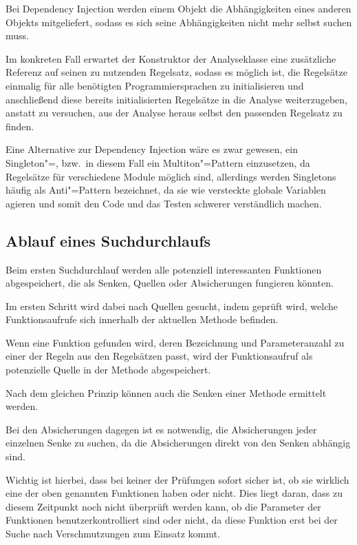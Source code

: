             Bei Dependency Injection werden einem Objekt die Abhängigkeiten eines anderen Objekts mitgeliefert,
            sodass es sich seine Abhängigkeiten nicht mehr selbst suchen muss.

            Im konkreten Fall erwartet der Konstruktor der Analyseklasse eine zusätzliche Referenz auf seinen zu nutzenden Regelsatz,
            sodass es möglich ist,
            die Regelsätze einmalig für alle benötigten Programmiersprachen zu initialisieren und
            anschließend diese bereits initialisierten Regelsätze in die Analyse weiterzugeben,
            anstatt zu versuchen,
            aus der Analyse heraus selbst den passenden Regelsatz zu finden.

            Eine Alternative zur Dependency Injection wäre es zwar gewesen,
            ein Singleton"=,
            bzw.\ in diesem Fall ein Multiton"=Pattern einzusetzen,
            da Regelsätze für verschiedene Module möglich sind,
            allerdings werden Singletons häufig als Anti"=Pattern bezeichnet,\cite{Hevery2008}
            da sie wie versteckte globale Variablen agieren und
            somit den Code und
            das Testen schwerer verständlich machen.

        \subsection{Ablauf eines Suchdurchlaufs}
            Beim ersten Suchdurchlauf werden alle potenziell interessanten Funktionen abgespeichert,
            die als Senken,
            Quellen oder
            Absicherungen fungieren könnten.

            Im ersten Schritt wird dabei nach Quellen gesucht,
            indem geprüft wird,
            welche Funktionsaufrufe sich innerhalb der aktuellen Methode befinden.

            Wenn eine Funktion gefunden wird,
            deren Bezeichnung und
            Parameteranzahl zu einer der Regeln aus den Regelsätzen passt,
            wird der Funktionsaufruf als potenzielle Quelle in der Methode abgespeichert.

            Nach dem gleichen Prinzip können auch die Senken einer Methode ermittelt werden.

            Bei den Absicherungen dagegen ist es notwendig,
            die Absicherungen jeder einzelnen Senke zu suchen,
            da die Absicherungen direkt von den Senken abhängig sind.

            Wichtig ist hierbei,
            dass bei keiner der Prüfungen sofort sicher ist,
            ob sie wirklich eine der oben genannten Funktionen haben oder
            nicht.
            Dies liegt daran,
            dass zu diesem Zeitpunkt noch nicht überprüft werden kann,
            ob die Parameter der Funktionen benutzerkontrolliert sind oder
            nicht,
            da diese Funktion erst bei der Suche nach Verschmutzungen zum Einsatz kommt.


